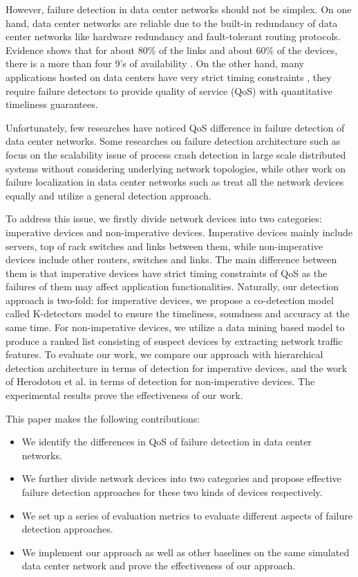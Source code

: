 \documentclass{sig-alternate-05-2015}
\begin{document}
However, failure detection in data center networks should not be simplex. On one hand, data center networks are reliable due to the built-in redundancy of data center networks like hardware redundancy and fault-tolerant routing protocols. Evidence shows that for about 80\% of the links and about 60\% of the devices, there is a more than four 9's of availability \cite{gill2011understanding}. On the other hand, many applications hosted on data centers have very strict timing constraints \cite{tomsic20152w}, they require failure detectors to provide quality of service (QoS) with quantitative timeliness guarantees.

Unfortunately, few researches have noticed QoS difference in failure detection of data center networks. Some researches on failure detection architecture such as \cite{felber1999failure}\cite{van1998gossip}\cite{gillen2007scalable}\cite{xu2012smart}\cite{xu2012smart} focus on the scalability issue of process crash detection in large scale distributed systems without considering underlying network topologies, while other work on failure localization in data center networks such as \cite{bahl2007towards}\cite{herodotou2014scalable}\cite{kandula2005shrink} treat all the network devices equally and utilize a general detection approach.

To address this issue, we firstly divide network devices into two categories: imperative devices and non-imperative devices. Imperative devices mainly include servers, top of rack switches and links between them, while non-imperative devices include other routers, switches and links. The main difference between them is that imperative devices have strict timing constraints of QoS as the failures of them may affect application functionalities. Naturally, our detection approach is two-fold: for imperative devices, we propose a co-detection model called K-detectors model to ensure the timeliness, soundness and accuracy at the same time. For non-imperative devices, we utilize a data mining based model to produce a ranked list consisting of suspect devices by extracting network traffic features. To evaluate our work, we compare our approach with hierarchical detection architecture \cite{felber1999failure} in terms of detection for imperative devices, and the work of Herodotou et al. \cite{herodotou2014scalable} in terms of detection for non-imperative devices. The experimental results prove the effectiveness of our work.

This paper makes the following contributions:
\begin{itemize}
  \item We identify the differences in QoS of failure detection in data center networks.
  \item We further divide network devices into two categories and propose effective failure detection approaches for these two kinds of devices respectively.
  \item We set up a series of evaluation metrics to evaluate different aspects of failure detection approaches.
  \item We implement our approach as well as other baselines on the same simulated data center network and prove the effectiveness of our approach.
\end{itemize}
\end{document}
